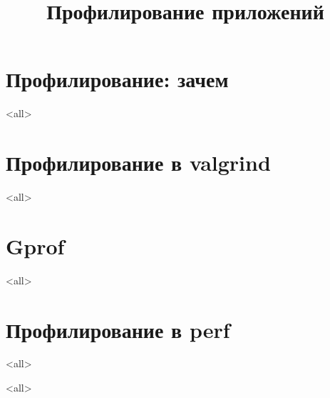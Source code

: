 

\title[Profiling]{Профилирование приложений}





\begin{frame}
	\frametitle{}
	\titlepage
	\vspace{-0.5cm}
	\begin{center}
	\end{center}
\end{frame}

\begin{frame}
	\tableofcontents
\end{frame}




\section{Профилирование: зачем}
\mode<all>{}

\section{Профилирование в valgrind}
\mode<all>{}

\section{Gprof}
\mode<all>{}

\section{Профилирование в perf}
\mode<all>{}

\mode<all>

